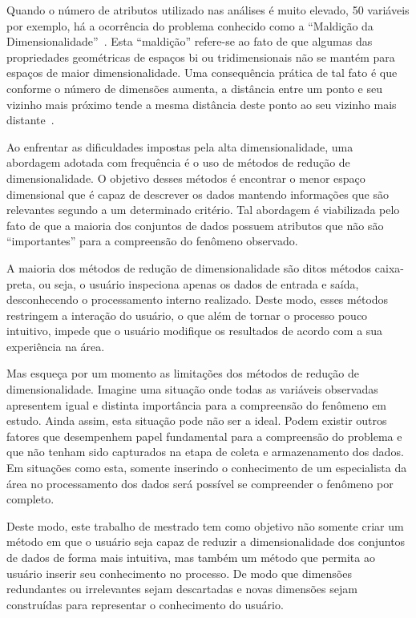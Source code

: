 Quando o número de atributos utilizado nas análises é muito elevado, 50 variáveis por exemplo, há a ocorrência do problema conhecido como a  ``Maldição da Dimensionalidade''~\cite{Beyer1999}. Esta ``maldição'' refere-se ao fato de que algumas das propriedades geométricas de espaços bi ou tridimensionais não se mantém para espaços de maior dimensionalidade. Uma consequência prática de tal fato é que conforme o número de  dimensões aumenta, a distância entre um ponto e seu vizinho mais próximo tende a mesma distância deste ponto ao seu vizinho mais distante~\citet{Beyer1999}.

Ao enfrentar as dificuldades impostas pela alta dimensionalidade, uma abordagem adotada com frequência é o uso de métodos de redução de dimensionalidade. O objetivo desses métodos é encontrar o menor espaço dimensional que é capaz de descrever os dados mantendo informações que são relevantes segundo a um determinado critério. Tal abordagem é  viabilizada pelo fato de que a maioria dos conjuntos de dados possuem atributos que não são ``importantes'' para a compreensão do fenômeno observado.

A maioria dos métodos de redução de dimensionalidade são ditos métodos caixa-preta, ou seja, o usuário inspeciona apenas os dados de entrada e saída, desconhecendo o processamento interno realizado. Deste modo, esses métodos restringem a interação do usuário, o que além de tornar o processo pouco intuitivo, impede que o usuário modifique os resultados de acordo com a sua experiência na área. 

Mas esqueça por um momento as limitações dos métodos de redução de dimensionalidade. Imagine uma situação onde todas as variáveis observadas apresentem igual e distinta importância para a compreensão do fenômeno em estudo. Ainda assim, esta situação pode não ser a ideal. Podem existir outros fatores que desempenhem papel fundamental para a compreensão do problema e que não tenham sido capturados na etapa de coleta e armazenamento dos dados. Em situações como esta, somente inserindo o conhecimento de um especialista da área no processamento dos dados será possível se compreender o fenômeno por completo. 

Deste modo, este trabalho de mestrado tem como objetivo não somente criar um método em que o usuário seja capaz de reduzir a dimensionalidade dos conjuntos de dados de forma mais intuitiva, mas também um método que permita ao usuário inserir seu conhecimento no processo. De modo que dimensões redundantes ou irrelevantes sejam descartadas e novas dimensões sejam construídas para representar o conhecimento do usuário. 

